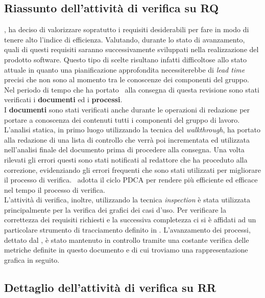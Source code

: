 \subsection{Riassunto dell'attività di verifica su RQ}
\gruppo, ha deciso di valorizzare sopratutto i requisiti desiderabili per fare in modo di tenere alto l'indice di efficienza. Valutando, durante lo stato di avanzamento, quali di questi requisiti saranno successivamente sviluppati nella realizzazione del prodotto software. Questo tipo di scelte risultano infatti difficoltose allo stato attuale in quanto una pianificazione approfondita necessiterebbe di \textit{lead time}  precisi che non sono al momento tra le conoscenze dei componenti del gruppo.
Nel periodo di tempo che ha portato \gruppo ~alla consegna di questa revisione sono stati verificati i \textbf{documenti} ed i \textbf{processi}.\\
I \textbf{documenti} sono stati verificati anche durante le operazioni di redazione per portare a conoscenza dei contenuti tutti i componenti del gruppo di lavoro.
L'analisi statica, in primo luogo utilizzando la tecnica del \textit{walkthrough}, ha portato alla redazione  di una lista di controllo che verrà poi incrementata ed utilizzata nell'analisi finale del documento prima di procedere alla consegna. Una volta rilevati gli errori questi sono stati notificati al redattore che ha proceduto alla correzione, evidenziando gli errori frequenti che sono stati utilizzati per migliorare il processo di verifica. \gruppo ~adotta il ciclo PDCA per rendere più efficiente ed efficace nel tempo il processo di verifica.\\
L'attività di verifica, inoltre, utilizzando la tecnica \textit{inspection} è stata utilizzata principalmente per la verifica dei grafici dei casi d'uso. Per verificare la correttezza dei requisiti richiesti e la successiva completezza ci si è affidati ad un particolare strumento di tracciamento definito in \infoNDP.
L'avanzamento dei processi, dettato dal \infoPDP, è stato mantenuto in controllo tramite una costante verifica delle metriche definite in questo documento e di cui troviamo una rappresentazione grafica in seguito.
\subsection{Dettaglio dell'attività di verifica su RR}
